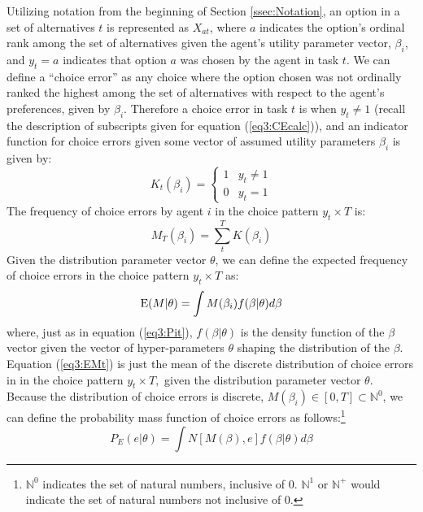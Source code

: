 \documentclass[../main.tex]{subfiles}
\begin{document}
Utilizing notation from the beginning of Section \ref{ssec:Notation}, an option in a set of alternatives $t$ is represented as $X_{at}$, where $a$ indicates the option's ordinal rank among the set of alternatives given the agent's utility parameter vector, $\beta_i$, and $y_t = a$ indicates that option $a$ was chosen by the agent in task $t$.
We can define a \enquote{choice error} as any choice where the option chosen was not ordinally ranked the highest among the set of alternatives with respect to the agent's preferences, given by $\beta_i$.
Therefore a choice error in task $t$ is when $y_t \neq 1$ (recall the description of subscripts given for equation (\ref{eq3:CEcalc})), and an indicator function for choice errors given some vector of assumed utility parameters $\beta_i$ is given by:
\begin{equation}
	\label{eq3:Itb}
	K_{t}(\beta_i) =
	\begin{cases}
		 1 & y_t \neq 1\\
		 0 & y_t = 1
	\end{cases}
\end{equation}
\noindent The frequency of choice errors by agent $i$ in the choice pattern $y_t \times T$ is:
\begin{equation}
	\label{eq3:MTBn}
	M_T(\beta_i) = \sum_t^T K(\beta_i)
\end{equation}
\noindent Given the distribution parameter vector $\theta$, we can define the expected frequency of choice errors in the choice pattern $y_t \times T$ as:
\begin{equation}
	\label{eq3:EMt}
	\operatorname{E}(M | \theta) = \int M(\beta_i) f(\beta | \theta) d\beta
\end{equation}
\noindent where, just as in equation (\ref{eq3:Pit}), $f(\beta|\theta)$ is the density function of the $\beta$ vector given the vector of hyper-parameters $\theta$ shaping the distribution of the $\beta$.
Equation (\ref{eq3:EMt}) is just the mean of the discrete distribution of choice errors in in the choice pattern $y_t \times T,$ given the distribution parameter vector $\theta$.
Because the distribution of choice errors is discrete, $M(\beta_i) \in [0,T] \subset \mathbb{N}^0$, we can define the probability mass function of choice errors as follows:\footnote{
	$\mathbb{N}^0$ indicates the set of natural numbers, inclusive of $0$. $\mathbb{N}^1$ or $\mathbb{N}^{+}$ would indicate the set of natural numbers not inclusive of 0.
}
\begin{equation}
	\label{eq3:PE}
	P_E(e | \theta) = \int N[M(\beta),e] f(\beta|\theta) d \beta
\end{equation}
\end{document}
